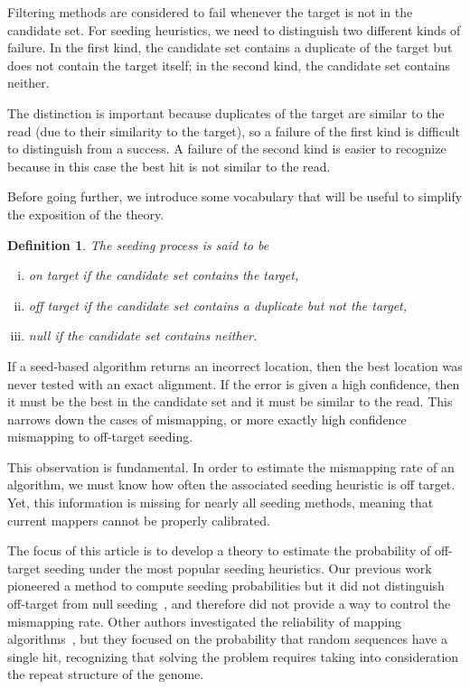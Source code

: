 \documentclass{article}
\newtheorem{definition}{Definition}
\begin{document}
Filtering methods are considered to fail whenever the target is not in the
candidate set. For seeding heuristics, we need to distinguish two
different kinds of failure. In the first kind, the candidate set contains 
a duplicate of the target but does not contain the target itself; in the
second kind, the candidate set contains neither.

The distinction is important because duplicates of the target are similar
to the read (due to their similarity to the target), so a failure of the
first kind is difficult to distinguish from a success. A failure of the
second kind is easier to recognize because in this case the best hit is
not similar to the read.

Before going further, we introduce some vocabulary that will be useful to
simplify the exposition of the theory.

\begin{definition}
The seeding process is said to be
\begin{enumerate}[i)]
\item on target if the candidate set contains the target,
\item off target if the candidate set contains a duplicate but
not the target, 
\item null if the candidate set contains neither.
\end{enumerate}
\end{definition}

If a seed-based algorithm returns an incorrect location, then the best
location was never tested with an exact alignment. If the error is given a
high confidence, then it must be the best in the candidate set and it must
be similar to the read. This narrows down the cases of mismapping, or more
exactly high confidence mismapping to off-target seeding.

This observation is fundamental. In order to estimate the mismapping rate
of an algorithm, we must know how often the associated seeding heuristic
is off target. Yet, this information is missing for nearly all seeding
methods, meaning that current mappers cannot be properly calibrated.

The focus of this article is to develop a theory to estimate the
probability of off-target seeding under the most popular seeding
heuristics. Our previous work pioneered a method to compute seeding
probabilities but it did not distinguish off-target from null
seeding~\cite{filion2017analytic,filion2018analytic}, and therefore did
not provide a way to control the mismapping rate. Other authors
investigated the reliability of mapping algorithms~\cite{pmid23872968},
but they focused on the probability that random sequences have a single
hit, recognizing that solving the problem requires taking into
consideration the repeat structure of the genome.
\end{document}
